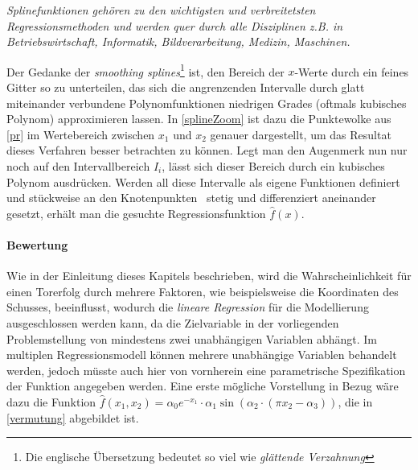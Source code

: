 \begin{itemize}

\textit{\glqq Splinefunktionen gehören zu den wichtigsten und verbreitetsten Regressionsmethoden und werden quer durch alle Disziplinen z.B. in Betriebswirtschaft, Informatik, Bildverarbeitung, Medizin, Maschinen.\grqq} 

Der Gedanke der \textit{smoothing splines}\footnote{Die englische Übersetzung bedeutet so viel wie \textit{glättende Verzahnung}} ist, den Bereich der $x$-Werte durch ein feines Gitter so zu unterteilen, das sich die angrenzenden Intervalle durch glatt miteinander verbundene Polynomfunktionen niedrigen Grades (oftmals kubisches Polynom) approximieren lassen. In \vref{splineZoom} ist dazu die Punktewolke aus \vref{pr} im Wertebereich zwischen $x_1$ und $x_2$ genauer dargestellt, um das Resultat dieses Verfahren besser betrachten zu können. Legt man den Augenmerk nun nur noch auf den Intervallbereich $I_i$, lässt sich dieser Bereich durch ein kubisches Polynom ausdrücken. Werden all diese Intervalle als eigene Funktionen definiert und stückweise an den \glqq Knotenpunkten\grqq~ stetig und differenziert aneinander gesetzt, erhält man die gesuchte Regressionsfunktion $\hat{f}(x)$.



\end{itemize}

\paragraph{Bewertung} Wie in der Einleitung dieses Kapitels beschrieben, wird die Wahrscheinlichkeit für einen Torerfolg durch mehrere Faktoren, wie beispielsweise die Koordinaten des Schusses, beeinflusst, wodurch die \textit{lineare Regression} für die Modellierung ausgeschlossen werden kann, da die Zielvariable in der vorliegenden Problemstellung von mindestens zwei unabhängigen Variablen abhängt. Im multiplen Regressionsmodell können mehrere unabhängige Variablen behandelt werden, jedoch müsste auch hier von vornherein eine parametrische Spezifikation der Funktion angegeben werden. Eine erste mögliche Vorstellung in Bezug wäre dazu die Funktion $\hat{f}(x_1,x_2) = \alpha_0 e^{-x_1} \cdot \alpha_1\sin(\alpha_2 \cdot (\pi x_2 - \alpha_3))$, die in \vref{vermutung} abgebildet ist. 


